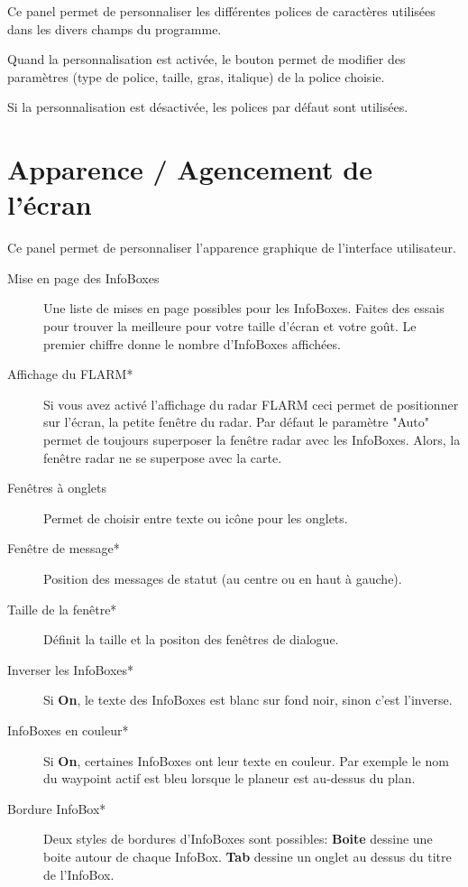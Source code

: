 Ce panel permet de personnaliser les différentes polices de caractères utilisées dans les divers champs du programme.


Quand la personnalisation est activée, le bouton  permet de modifier des paramètres (type de police, taille, gras, italique) de la police choisie.

Si la personnalisation est désactivée, les polices par défaut sont utilisées.

\section{Apparence / Agencement de l'écran}\label{sec:interface-appearance}

Ce panel permet de personnaliser l'apparence graphique de l'interface utilisateur.

\begin{description}
\item[Mise en page des InfoBoxes]  Une liste de mises en page possibles pour les InfoBoxes. Faites des essais pour trouver la meilleure pour votre taille d'écran et votre goût. Le premier chiffre donne le nombre d'InfoBoxes affichées.
\item[Affichage du FLARM*]  \label{conf:flarmradar-place}
Si vous avez activé l'affichage du radar FLARM ceci permet de positionner sur l'écran, la petite fenêtre du radar. Par défaut le paramètre "Auto" permet de toujours superposer la fenêtre radar avec les InfoBoxes. Alors, la fenêtre radar ne se superpose avec la carte. 
\item[Fenêtres à onglets]  Permet de choisir entre texte ou icône pour les onglets.
\item[Fenêtre de message*]  Position des messages de statut (au centre ou en haut à gauche).
\item[Taille de la fenêtre*]  Définit la taille et la positon des fenêtres de dialogue.
\item[Inverser les InfoBoxes*]  Si {\bf On}, le texte des InfoBoxes est blanc sur fond noir, sinon c'est l'inverse.
\item[InfoBoxes en couleur*]  Si {\bf On}, certaines InfoBoxes ont leur texte en couleur. Par exemple le nom du waypoint actif est bleu lorsque le planeur est au-dessus du plan.
\item[Bordure InfoBox*]  Deux styles de bordures d'InfoBoxes sont possibles:  {\bf Boite} dessine une boite autour de chaque InfoBox. {\bf Tab} dessine un onglet au dessus du titre de l'InfoBox.
\end{description}


